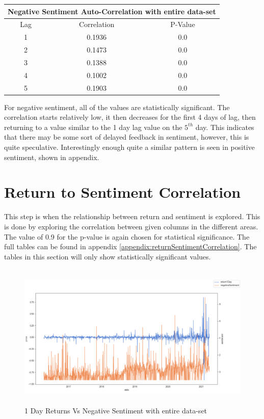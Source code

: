\begin{center}
\begin{tabular}{ c c c }
\hline
\multicolumn{3}{|c|}{Negative Sentiment Auto-Correlation with entire data-set} \\
\hline
Lag & Correlation & P-Value \\
\hline
1 & 0.1936 & 0.0 \\
2 & 0.1473 & 0.0 \\
3 & 0.1388 & 0.0 \\
4 & 0.1002 & 0.0 \\
5 & 0.1903 & 0.0 \\
\end{tabular}
\end{center}
For negative sentiment, all of the values are statistically significant. The correlation starts relatively low, it then decreases for the first 4 days of lag, then returning to a value similar to the 1 day lag value on the $5^{th}$ day. This indicates that there may be some sort of delayed feedback in sentiment, however, this is quite speculative. Interestingly enough quite a similar pattern is seen in positive sentiment, shown in appendix.

\section{Return to Sentiment Correlation}

This step is when the relationship between return and sentiment is explored. This is done by exploring the correlation between given columns in the different areas. The value of 0.9 for the p-value is again chosen for statistical significance. The full tables can be found in appendix \ref{appendix:returnSentimentCorrelation}. The tables in this section will only show statistically significant values.

\begin{figure}[h!]
    \centering
    \includegraphics[width=15cm,height=7cm,keepaspectratio]{resultsEvaluation/1returnVsNeg.png}
    \caption{1 Day Returns Vs Negative Sentiment with entire data-set}
    \label{fig:1returnVsNeg}
\end{figure}

